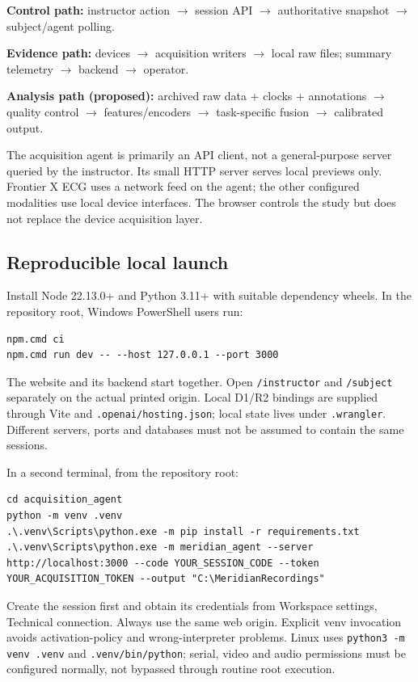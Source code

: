\documentclass[11pt,a4paper]{article}
\newcommand{\code}[1]{{\small\nolinkurl{#1}}}
\begin{document}
\textbf{Control path:} instructor action $\rightarrow$ session API $\rightarrow$ authoritative snapshot $\rightarrow$ subject/agent polling.\par
\textbf{Evidence path:} devices $\rightarrow$ acquisition writers $\rightarrow$ local raw files; summary telemetry $\rightarrow$ backend $\rightarrow$ operator.\par
\textbf{Analysis path (proposed):} archived raw data + clocks + annotations $\rightarrow$ quality control $\rightarrow$ features/encoders $\rightarrow$ task-specific fusion $\rightarrow$ calibrated output.

The acquisition agent is primarily an API client, not a general-purpose server queried by the instructor. Its small HTTP server serves local previews only. Frontier X ECG uses a network feed on the agent; the other configured modalities use local device interfaces. The browser controls the study but does not replace the device acquisition layer.

\subsection{Reproducible local launch}
Install Node 22.13.0+ and Python 3.11+ with suitable dependency wheels. In the repository root, Windows PowerShell users run:
\begin{lstlisting}
npm.cmd ci
npm.cmd run dev -- --host 127.0.0.1 --port 3000
\end{lstlisting}
The website and its backend start together. Open \code{/instructor} and \code{/subject} separately on the actual printed origin. Local D1/R2 bindings are supplied through Vite and \code{.openai/hosting.json}; local state lives under \code{.wrangler}. Different servers, ports and databases must not be assumed to contain the same sessions.

\begin{minipage}{\linewidth}
In a second terminal, from the repository root:
\begin{lstlisting}
cd acquisition_agent
python -m venv .venv
.\.venv\Scripts\python.exe -m pip install -r requirements.txt
.\.venv\Scripts\python.exe -m meridian_agent --server http://localhost:3000 --code YOUR_SESSION_CODE --token YOUR_ACQUISITION_TOKEN --output "C:\MeridianRecordings"
\end{lstlisting}
\end{minipage}\par
Create the session first and obtain its credentials from Workspace settings, Technical connection. Always use the same web origin. Explicit venv invocation avoids activation-policy and wrong-interpreter problems. Linux uses \code{python3 -m venv .venv} and \code{.venv/bin/python}; serial, video and audio permissions must be configured normally, not bypassed through routine root execution.
\end{document}
